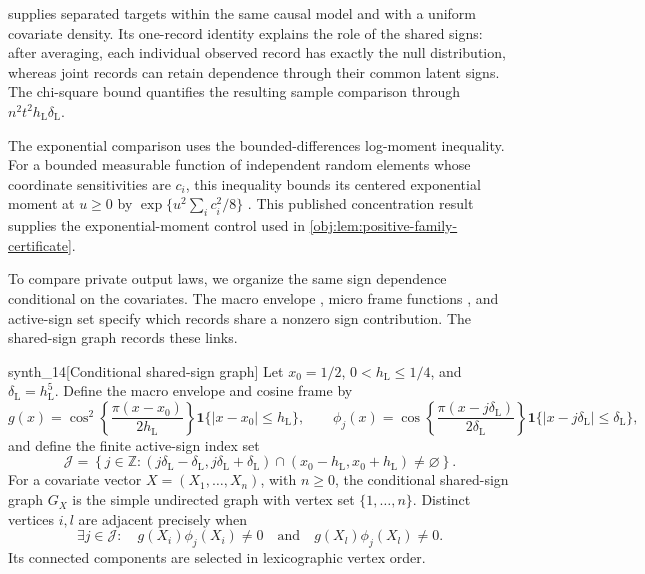  supplies separated targets within the same causal model and with a uniform covariate density. Its one-record identity explains the role of the shared signs: after averaging, each individual observed record has exactly the null distribution, whereas joint records can retain dependence through their common latent signs. The chi-square bound quantifies the resulting sample comparison through \(n^2t^2h_{\mathrm L}\delta_{\mathrm L}\).

The exponential comparison uses the bounded-differences log-moment inequality. For a bounded measurable function of independent random elements whose coordinate sensitivities are \(c_i\), this inequality bounds its centered exponential moment at \(u\ge0\) by \(\exp\{u^2\sum_i c_i^2/8\}\) \citep[Theorem 6.2, displayed log-mgf conclusion in its proof, p.~167]{BoucheronLugosiMassart2013}. This published concentration result supplies the exponential-moment control used in \cref{obj:lem:positive-family-certificate}.

To compare private output laws, we organize the same sign dependence conditional on the covariates. The macro envelope , micro frame functions , and active-sign set  specify which records share a nonzero sign contribution. The shared-sign graph  records these links.

\begin{definitionv}{synth_14}[Conditional shared-sign graph]
Let \(x_0=1/2\), \(0<h_{\mathrm L}\le1/4\), and \(\delta_{\mathrm L}=h_{\mathrm L}^5\). Define the macro envelope and cosine frame by
\[
g(x)=\cos^2\!\left\{\frac{\pi(x-x_0)}{2h_{\mathrm L}}\right\}
\mathbf1\{|x-x_0|\le h_{\mathrm L}\},
\qquad
\phi_j(x)=\cos\!\left\{\frac{\pi(x-j\delta_{\mathrm L})}{2\delta_{\mathrm L}}\right\}
\mathbf1\{|x-j\delta_{\mathrm L}|\le\delta_{\mathrm L}\},
\]
and define the finite active-sign index set
\[
\mathcal J=
\left\{j\in\mathbb Z:
(j\delta_{\mathrm L}-\delta_{\mathrm L},j\delta_{\mathrm L}+\delta_{\mathrm L})
\cap(x_0-h_{\mathrm L},x_0+h_{\mathrm L})\ne\varnothing
\right\}.
\]
For a covariate vector \(X=(X_1,\ldots,X_n)\), with \(n\ge0\), the conditional shared-sign graph \(G_X\) is the simple undirected graph with vertex set \(\{1,\ldots,n\}\). Distinct vertices \(i,l\) are adjacent precisely when
\[
\exists j\in\mathcal J:\quad
g(X_i)\phi_j(X_i)\ne0
\quad\text{and}\quad
g(X_l)\phi_j(X_l)\ne0.
\]
Its connected components are selected in lexicographic vertex order.
\end{definitionv}

